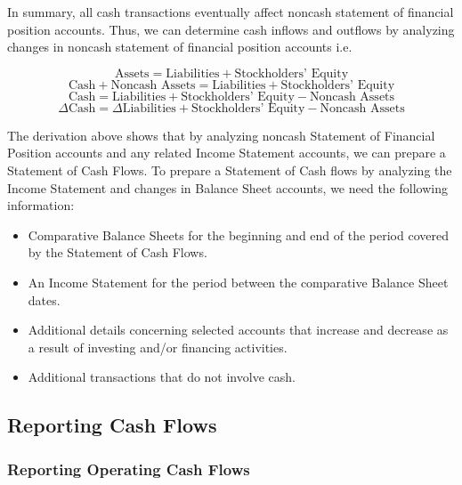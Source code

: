 \documentclass[../main.tex]{subfiles}
\begin{document}
	In summary, all cash transactions eventually affect noncash statement of 
	financial position accounts. Thus, we can determine cash inflows and 
	outflows by analyzing changes in noncash statement of financial position 
	accounts i.e.
	
	\begin{equation}
		\text{Assets} = \text{Liabilities} + \text{Stockholders' Equity}
	\end{equation}
	\begin{equation}
		\text{Cash} + \text{Noncash Assets} = \text{Liabilities} + 
		\text{Stockholders' Equity}
	\end{equation}
	\begin{equation}
		\text{Cash} = \text{Liabilities} + 
		\text{Stockholders' Equity} - \text{Noncash Assets}
	\end{equation}
	\begin{equation}
		\Delta \text{Cash} = \Delta \text{Liabilities} + \text{Stockholders' 
		Equity} - \text{Noncash Assets}
	\end{equation}
	
	The derivation above shows that by analyzing noncash Statement of Financial 
	Position accounts and any related Income Statement accounts, we can prepare 
	a Statement of Cash Flows. To prepare a Statement of Cash flows by 
	analyzing the Income Statement and changes in Balance Sheet accounts, we 
	need the following information:
	\begin{itemize}[noitemsep]
		\item Comparative Balance Sheets for the beginning and end of the 
		period covered by the Statement of Cash Flows.
		\item An Income Statement for the period between the comparative 
		Balance Sheet dates.
		\item Additional details concerning selected accounts that increase and 
		decrease as a result of investing and/or financing activities.
		\item  Additional transactions that do not involve cash.
	\end{itemize}
	
	\subsection{Reporting Cash Flows}
	
	\subsubsection{Reporting Operating Cash Flows}
	
\end{document}
